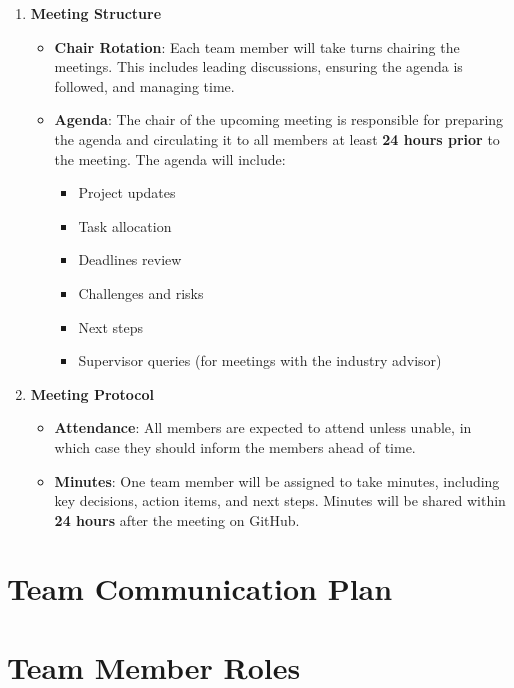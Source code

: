\documentclass{article}
\begin{document}
\begin{enumerate}[label=\textbf{\arabic*}]
    \item \textbf{Meeting Structure}
    \begin{itemize}
    \item \textbf{Chair Rotation}: Each team member will take turns chairing the meetings. This includes leading discussions, ensuring the agenda is followed, and managing time.
    \item \textbf{Agenda}: The chair of the upcoming meeting is responsible for preparing the agenda and circulating it to all members at least \textbf{24 hours prior} to the meeting. The agenda will include:
    \begin{itemize}
        \item Project updates
        \item Task allocation
        \item Deadlines review
        \item Challenges and risks
        \item Next steps
        \item Supervisor queries (for meetings with the industry advisor)
    \end{itemize}
    \end{itemize}

    \item \textbf{Meeting Protocol}
    \begin{itemize}
        \item \textbf{Attendance}: All members are expected to attend unless unable, in which case they should inform the members ahead of time.
        \item \textbf{Minutes}: One team member will be assigned to take minutes, including key decisions, action items, and next steps. Minutes will be shared within \textbf{24 hours} after the meeting on GitHub.
    \end{itemize}

\end{enumerate}


\section{Team Communication Plan}


\section{Team Member Roles}
\end{document}
